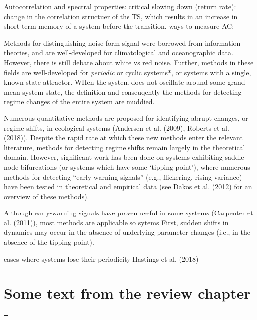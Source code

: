 \documentclass[12pt,twoside,openany]{reedthesis}
\begin{document}
Autocorrelation and spectral properties:
critical slowing down (return rate): change in the correlation structuer of the TS, which results in an increase in short-term memory of a system before the transition.
ways to measure AC:

Methods for distinguishing noise form signal were borrowed from information theories, and are well-developed for climatological and oceanographic data. However, there is still debate about white vs red noise. Further, methods in these fields are well-developed for \emph{periodic} or cyclic systems*, or systems with a single, known state attractor. WHen the system does not oscillate around some grand mean system state, the definition and conseuqently the methods for detecting regime changes of the entire system are muddied.

Numerous quantitative methods are proposed for identifying abrupt changes, or regime shifts, in ecological systems (Andersen et al. (2009), Roberts et al. (2018)). Despite the rapid rate at which these new methods enter the relevant literature, methods for detecting regime shifts remain largely in the theoretical domain. However, significant work has been done on systems exhibiting saddle-node bifurcations (or systems which have some `tipping point'), where numerous methods for detecting ``early-warning signals'' (e.g., flickering, rising variance) have been tested in theoretical and empirical data (see Dakos et al. (2012) for an overview of these methods).

Although early-warning signals have proven useful in some systems (Carpenter et al. (2011)), most methods are applicable so sytems First, sudden shifts in dynamics may
occur in the absence of underlying parameter
changes (i.e., in the absence of the tipping point).

cases where systems lose their periodicity
Hastings et al. (2018)

\hypertarget{some-text-from-the-review-chapter--}{%
\section{Some text from the review chapter -}\label{some-text-from-the-review-chapter--}}
\end{document}
